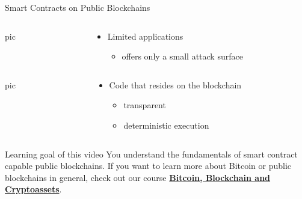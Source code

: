 \documentclass[]{beamer}
\begin{document}
\begin{frame}{Smart Contracts on Public Blockchains}

\begin{columns}
	\begin{column}{0.3\textwidth}
		pic
	\end{column}
	
	\begin{column}{0.7\textwidth}
		\begin{itemize}
			\item Limited applications
			\begin{itemize}
				\item offers only a small attack surface
			\end{itemize}
		\end{itemize}
	\end{column}
	
\end{columns}

\vspace{1.5em}

\begin{columns}

\begin{column}{0.3\textwidth}
	pic
\end{column}

\begin{column}{0.7\textwidth}
\begin{itemize}
\item Code that resides on the blockchain
\begin{itemize}
\item transparent
\item deterministic execution
\end{itemize}
\end{itemize}
\end{column}
\end{columns}

\vspace{1.5em}

\begin{alertblock}{Learning goal of this video}
You understand the fundamentals of smart contract capable public blockchains. If you want to learn more about Bitcoin or public blockchains in general, check out our course \href{https://www.youtube.com/watch?v=7eAybINMdiM&list=PLoVRRjQbqYFw4wJ-oh-_iGPBiSvwDtUw0}{\link \textbf{Bitcoin, Blockchain and Cryptoassets}}.
\end{alertblock}
\end{frame}
\end{document}
